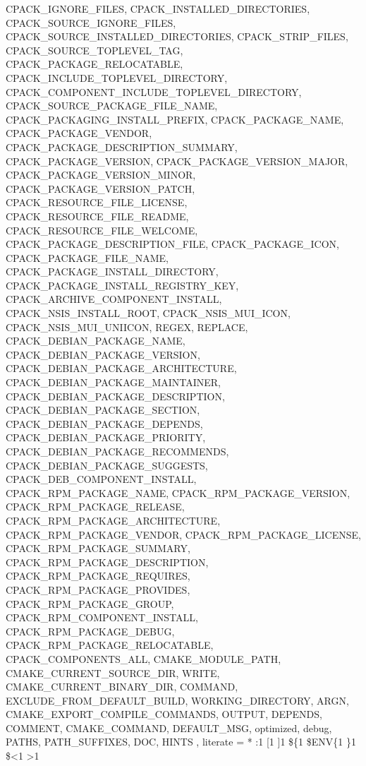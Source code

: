 {{						CPACK_IGNORE_FILES, CPACK_INSTALLED_DIRECTORIES, CPACK_SOURCE_IGNORE_FILES,
						CPACK_SOURCE_INSTALLED_DIRECTORIES, CPACK_STRIP_FILES, CPACK_SOURCE_TOPLEVEL_TAG,
						CPACK_PACKAGE_RELOCATABLE, CPACK_INCLUDE_TOPLEVEL_DIRECTORY,
						CPACK_COMPONENT_INCLUDE_TOPLEVEL_DIRECTORY, CPACK_SOURCE_PACKAGE_FILE_NAME,
						CPACK_PACKAGING_INSTALL_PREFIX, CPACK_PACKAGE_NAME, CPACK_PACKAGE_VENDOR,
						CPACK_PACKAGE_DESCRIPTION_SUMMARY, CPACK_PACKAGE_VERSION, CPACK_PACKAGE_VERSION_MAJOR,
						CPACK_PACKAGE_VERSION_MINOR, CPACK_PACKAGE_VERSION_PATCH, CPACK_RESOURCE_FILE_LICENSE,
						CPACK_RESOURCE_FILE_README, CPACK_RESOURCE_FILE_WELCOME, CPACK_PACKAGE_DESCRIPTION_FILE,
						CPACK_PACKAGE_ICON, CPACK_PACKAGE_FILE_NAME, CPACK_PACKAGE_INSTALL_DIRECTORY,
						CPACK_PACKAGE_INSTALL_REGISTRY_KEY, CPACK_ARCHIVE_COMPONENT_INSTALL,
						CPACK_NSIS_INSTALL_ROOT, CPACK_NSIS_MUI_ICON, CPACK_NSIS_MUI_UNIICON, REGEX, REPLACE, 
						CPACK_DEBIAN_PACKAGE_NAME, CPACK_DEBIAN_PACKAGE_VERSION, CPACK_DEBIAN_PACKAGE_ARCHITECTURE,
						CPACK_DEBIAN_PACKAGE_MAINTAINER, CPACK_DEBIAN_PACKAGE_DESCRIPTION, CPACK_DEBIAN_PACKAGE_SECTION,
						CPACK_DEBIAN_PACKAGE_DEPENDS, CPACK_DEBIAN_PACKAGE_PRIORITY, CPACK_DEBIAN_PACKAGE_RECOMMENDS,
						CPACK_DEBIAN_PACKAGE_SUGGESTS, CPACK_DEB_COMPONENT_INSTALL, CPACK_RPM_PACKAGE_NAME,
						CPACK_RPM_PACKAGE_VERSION, CPACK_RPM_PACKAGE_RELEASE, CPACK_RPM_PACKAGE_ARCHITECTURE,
						CPACK_RPM_PACKAGE_VENDOR, CPACK_RPM_PACKAGE_LICENSE, CPACK_RPM_PACKAGE_SUMMARY,
						CPACK_RPM_PACKAGE_DESCRIPTION, CPACK_RPM_PACKAGE_REQUIRES, CPACK_RPM_PACKAGE_PROVIDES,
						CPACK_RPM_PACKAGE_GROUP, CPACK_RPM_COMPONENT_INSTALL, CPACK_RPM_PACKAGE_DEBUG, CPACK_RPM_PACKAGE_RELOCATABLE,
						CPACK_COMPONENTS_ALL,
						CMAKE_MODULE_PATH, CMAKE_CURRENT_SOURCE_DIR, WRITE, CMAKE_CURRENT_BINARY_DIR, COMMAND, EXCLUDE_FROM_DEFAULT_BUILD,
						WORKING_DIRECTORY, ARGN, CMAKE_EXPORT_COMPILE_COMMANDS, OUTPUT, DEPENDS, COMMENT, CMAKE_COMMAND,
						DEFAULT_MSG, optimized, debug, PATHS, PATH_SUFFIXES, DOC, HINTS }
,	literate         = *
			{:}{{\lst@ifdisplaystyle\color{msvc_operators}\fi{:}}}{1}
			{[}{{\lst@ifdisplaystyle\color{msvc_operators}\fi{[}}}{1}
            {]}{{\lst@ifdisplaystyle\color{msvc_operators}\fi{]}}}{1}
            {\$\{}{{\lst@ifdisplaystyle\color{msvc_string}\fi{\$\{}}}{1}
            {\$ENV\{}{{\lst@ifdisplaystyle\color{msvc_string}}}{1}
            {\}}{{\lst@ifdisplaystyle\color{msvc_string}\fi{\}}}}{1}
            {\$<}{{\lst@ifdisplaystyle\color{msvc_string}\fi{\$<}}}{1}
            {>}{{\lst@ifdisplaystyle\color{msvc_string}\fi{>}}}{1}
}
